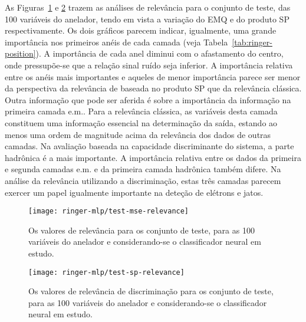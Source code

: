 As Figuras~\ref{fig:ringer-mse-relevance} e \ref{fig:ringer-sp-relevance}
trazem as análises de relevância para o conjunto de teste, das 100 variáveis
do anelador, tendo em vista a variação do EMQ e do produto SP
respectivamente. Os dois gráficos parecem indicar, igualmente, uma grande
importância nos primeiros anéis de cada camada (veja
Tabela~\ref{tab:ringer-position}). A importância de cada anel diminui com o
afastamento do centro, onde pressupõe-se que a relação sinal ruído seja
inferior. A importância relativa entre os anéis mais importantes e aqueles de
menor importância parece ser menor da perspectiva da relevância de baseada no
produto SP que da relevância clássica. Outra informação que pode ser aferida é
sobre a importância da informação na primeira camada e.m.. Para a relevância
clássica, as variáveis desta camada constituem uma informação essencial na
determinação da saída, estando ao menos uma ordem de magnitude acima da
relevância dos dados de outras camadas. Na avaliação baseada na capacidade
discriminante do sistema, a parte hadrônica é a mais importante. A importância
relativa entre os dados da primeira e segunda camadas e.m. e da primeira
camada hadrônica também difere. Na análise da relevância utilizando a
discriminação, estas três camadas parecem exercer um papel igualmente
importante na deteção de elétrons e jatos.

\begin{figure}
\begin{center}
\texttt{[image: ringer-mlp/test-mse-relevance]}
\end{center}
\caption{Os valores de relevância para os conjunto de teste, para as 100
variáveis do anelador e considerando-se o classificador neural em estudo.}
\label{fig:ringer-mse-relevance}
\end{figure}

\begin{figure}
\begin{center}
\texttt{[image: ringer-mlp/test-sp-relevance]}
\end{center}
\caption{Os valores de relevância de discriminação para os conjunto de teste,
para as 100 variáveis do anelador e considerando-se o classificador neural em
estudo.}
\label{fig:ringer-sp-relevance}
\end{figure}

